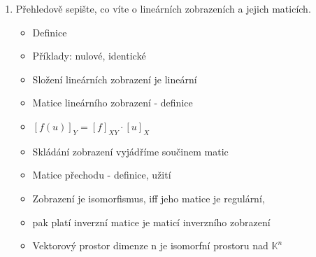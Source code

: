 \documentclass[10pt,a4paper]{article}
\begin{document}
\begin{enumerate}
\item Přehledově sepište, co víte o lineárních zobrazeních a jejich maticích.

\begin{itemize}[label=$\circ$]
\item Definice
\item Příklady: nulové, identické 
\item Složení lineárních zobrazení je lineární
\item Matice lineárního zobrazení - definice
\item $[f(u)]_Y = [f]_{XY} \cdot [u]_{X}$
\item Skládání zobrazení vyjádříme součinem matic
\item Matice přechodu - definice, užití
\item Zobrazení je isomorfismus, iff jeho matice je regulární,
\item pak platí inverzní matice je maticí inverzního zobrazení
\item Vektorový prostor dimenze n je isomorfní prostoru nad $\mathbb{K}^n$
	
\end{itemize}

\end{enumerate}
\end{document}

